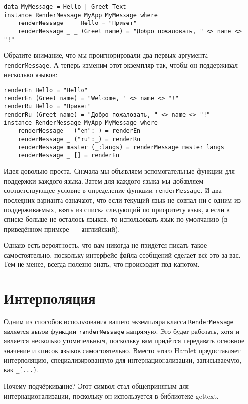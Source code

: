 \begin{lstlisting}
data MyMessage = Hello | Greet Text
instance RenderMessage MyApp MyMessage where
    renderMessage _ _ Hello = "Привет"
    renderMessage _ _ (Greet name) = "Добро пожаловать, " <> name <> "!"
\end{lstlisting}

Обратите внимание, что мы проигнорировали два первых аргумента
\lstinline'renderMessage'. А теперь изменим этот экземпляр так, чтобы он
поддерживал несколько языков:

\begin{lstlisting}
renderEn Hello = "Hello"
renderEn (Greet name) = "Welcome, " <> name <> "!"
renderRu Hello = "Привет"
renderRu (Greet name) = "Добро пожаловать, " <> name <> "!"
instance RenderMessage MyApp MyMessage where
    renderMessage _ ("en":_) = renderEn
    renderMessage _ ("ru":_) = renderRu
    renderMessage master (_:langs) = renderMessage master langs
    renderMessage _ [] = renderEn
\end{lstlisting}

Идея довольно проста. Сначала мы объявляем вспомогательные функции для
поддержки каждого языка. Затем для каждого языка мы добавляем соответствующее
условие в определение функции \lstinline'renderMessage'. И два последних
варианта означают, что если текущий язык не совпал ни с одним из
поддерживаемых, взять из списка следующий по приоритету язык, а если в списке
больше не осталось языков, то использовать язык по умолчанию (в приведённом
примере~--- английский).

Однако есть вероятность, что вам никогда не придётся писать такое
самостоятельно, поскольку интерфейс файла сообщений сделает всё это за вас. Тем
не менее, всегда полезно знать, что происходит под капотом.

\section{Интерполяция}

Одним из способов использования вашего экземпляра класса
\lstinline'RenderMessage' является вызов функции \lstinline'renderMessage'
напрямую. Это будет работать, хотя и является несколько утомительным, поскольку
вам придётся передавать основное значение и список языков самостоятельно.
Вместо этого Hamlet предоставляет интерполяцию, специализированную для
интернационализации, записываемую, как \lstinline'_{...}'.

\begin{remark}
    Почему подчёркивание? Этот символ стал общепринятым для
    интернационализации, поскольку он используется в библиотеке gettext.
\end{remark}

